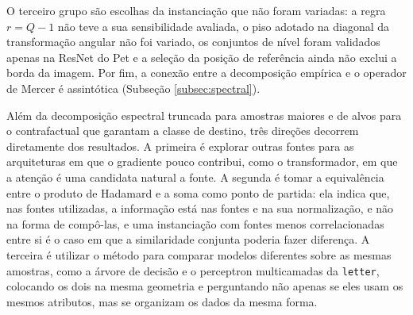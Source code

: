 O terceiro grupo são escolhas da instanciação que não foram variadas: a regra $r=Q-1$ não teve a sua sensibilidade avaliada, o piso adotado na diagonal da transformação angular não foi variado, os conjuntos de nível foram validados apenas na ResNet do Pet e a seleção da posição de referência ainda não exclui a borda da imagem. Por fim, a conexão entre a decomposição empírica e o operador de Mercer é assintótica (Subseção \ref{subsec:spectral}).

Além da decomposição espectral truncada para amostras maiores e de alvos para o contrafactual que garantam a classe de destino, três direções decorrem diretamente dos resultados. A primeira é explorar outras fontes para as arquiteturas em que o gradiente pouco contribui, como o transformador, em que a atenção é uma candidata natural a fonte. A segunda é tomar a equivalência entre o produto de Hadamard e a soma como ponto de partida: ela indica que, nas fontes utilizadas, a informação está nas fontes e na sua normalização, e não na forma de compô-las, e uma instanciação com fontes menos correlacionadas entre si é o caso em que a similaridade conjunta poderia fazer diferença. A terceira é utilizar o método para comparar modelos diferentes sobre as mesmas amostras, como a árvore de decisão e o perceptron multicamadas da \texttt{letter}, colocando os dois na mesma geometria e perguntando não apenas se eles usam os mesmos atributos, mas se organizam os dados da mesma forma.
